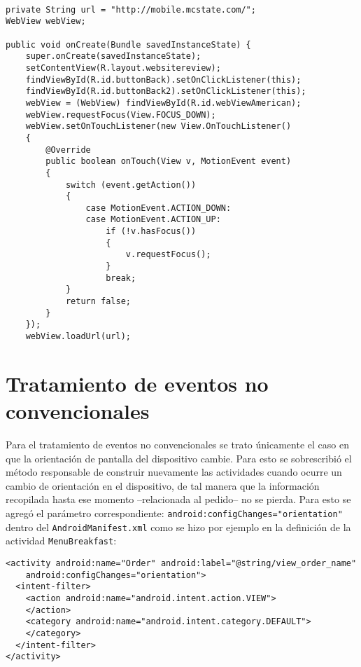 \documentclass[letterpaper,12pt]{book}
\begin{document}
\begin{mainmatter}
\begin{scriptsize}
\begin{lstlisting}

private String url = "http://mobile.mcstate.com/";
WebView webView;

public void onCreate(Bundle savedInstanceState) {
	super.onCreate(savedInstanceState);
	setContentView(R.layout.websitereview);
	findViewById(R.id.buttonBack).setOnClickListener(this);
	findViewById(R.id.buttonBack2).setOnClickListener(this);
	webView = (WebView) findViewById(R.id.webViewAmerican);
	webView.requestFocus(View.FOCUS_DOWN);
	webView.setOnTouchListener(new View.OnTouchListener()
	{
	    @Override
	    public boolean onTouch(View v, MotionEvent event)
	    {
	        switch (event.getAction())
	        {
	            case MotionEvent.ACTION_DOWN:
	            case MotionEvent.ACTION_UP:
	                if (!v.hasFocus())
	                {
	                    v.requestFocus();
	                }
	                break;
	        }
	        return false;
	    }
	});
	webView.loadUrl(url);
\end{lstlisting}
\end{scriptsize}

\section{Tratamiento de eventos no convencionales}

Para el tratamiento de eventos no convencionales se trato únicamente
el caso en que la orientación de pantalla del dispositivo cambie. Para
esto se sobrescribió el método responsable de construir
nuevamente las actividades cuando ocurre un cambio de orientación en
el dispositivo, de tal manera que la información recopilada hasta ese
momento --relacionada al pedido-- no se pierda. Para esto se agregó el
parámetro correspondiente: \verb|android:configChanges="orientation"| dentro
del \texttt{AndroidManifest.xml} como se hizo por ejemplo en la definición de
la actividad \texttt{MenuBreakfast}:


\lstset{language=Xml, tabsize=2, showstringspaces=false}\ttfamily
\begin{scriptsize}
\begin{lstlisting}
<activity android:name="Order" android:label="@string/view_order_name" 
	android:configChanges="orientation">
  <intent-filter>
	<action android:name="android.intent.action.VIEW">
	</action>
	<category android:name="android.intent.category.DEFAULT">
	</category>
  </intent-filter>
</activity>


\end{lstlisting}
\end{scriptsize}
\end{mainmatter}
\end{document}
